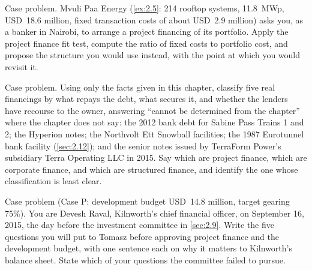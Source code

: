 \begin{exercise}\label{exr:2.11}
Case problem. Mvuli Paa Energy (\cref{ex:2.5}: 214 rooftop systems, 11.8~MWp, USD~18.6 million, fixed transaction costs of about USD~2.9 million) asks you, as a banker in Nairobi, to arrange a project financing of its portfolio. Apply the project finance fit test, compute the ratio of fixed costs to portfolio cost, and propose the structure you would use instead, with the point at which you would revisit it.
\end{exercise}

\begin{exercise}\label{exr:2.12}
Case problem. Using only the facts given in this chapter, classify five real financings by what repays the debt, what secures it, and whether the lenders have recourse to the owner, answering ``cannot be determined from the chapter'' where the chapter does not say: the 2012 bank debt for Sabine Pass Trains 1 and 2; the Hyperion notes; the Northvolt Ett Snowball facilities; the 1987 Eurotunnel bank facility (\cref{sec:2.12}); and the senior notes issued by TerraForm Power's subsidiary Terra Operating LLC in 2015. Say which are project finance, which are corporate finance, and which are structured finance, and identify the one whose classification is least clear.
\end{exercise}

\begin{exercise}\label{exr:2.13}
Case problem (Case P: development budget USD~14.8 million, target gearing 75\%). You are Devesh Raval, Kilnworth's chief financial officer, on September 16, 2015, the day before the investment committee in \cref{sec:2.9}. Write the five questions you will put to Tomasz before approving project finance and the development budget, with one sentence each on why it matters to Kilnworth's balance sheet. State which of your questions the committee failed to pursue.
\end{exercise}


